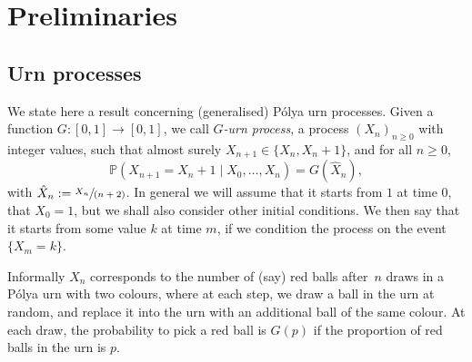 \documentclass[10pt]{amsart}
\newcommand{\spfrac}[2]{\sfrac{#1}{(#2)}}
\numberwithin{equation}{section}
\theoremstyle{definition}
\begin{document}
\section{Preliminaries}\label{sec.prelim}

\subsection{Urn processes}
We state here a result concerning (generalised) Pólya urn processes.
Given a function $G:[0,1]\to [0,1]$, we call \emph{$G$-urn process}, a process $(X_n)_{n\ge 0}$ with integer values, such that almost surely $X_{n+1}
\in \{X_n,X_n+1\}$, and for all $n\ge 0$,
\[
\mathbb P(X_{n+1} = X_n +1 \mid X_0,\dots,X_n) = G(\hat X_n),
\]
with $\hat X_n :=\spfrac{X_n}{n+2}$.
In general we will assume that it starts from $1$ at time $0$, \ie that $X_0=1$, but we shall also consider other initial condition{s}.
We then say that it starts from some value $k$ at time $m$, if we condition the process on the event $\{X_m=k\}$.

Informally $X_n$ corresponds
to the number of (say) red balls after~$n$ draws in a Pólya urn with two colours,
where at each step, we draw a ball in the urn at random, and replace it into the urn with an additional ball of the same colour. At each draw, the probability to pick a red ball is $G(p)$
if the proportion of red balls in the urn is $p$.
\end{document}
